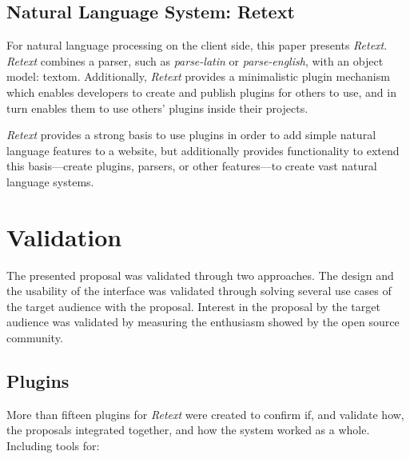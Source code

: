 \section{Natural Language System:
  Retext}\label{natural-language-system-retext}

For natural language processing on the client side, this paper presents
  \emph{Retext}.
\emph{Retext} combines a parser, such as \emph{parse-latin} or
  \emph{parse-english}, with an object model: \gls{textom}.
Additionally, \emph{Retext} provides a minimalistic plugin mechanism which
  enables developers to create and publish plugins for others to use, and in
  turn enables them to use others' plugins inside their projects.

\emph{Retext} provides a strong basis to use plugins in order to add simple
  natural language features to a website, but additionally provides
  functionality to extend this basis---create plugins, parsers, or other
  features---to create vast natural language systems.

\chapter{Validation}\label{validation}

The presented proposal was validated through two approaches.
The design and the usability of the interface was validated through
  solving several use cases of the target audience with the proposal.
Interest in the proposal by the target audience was validated by
  measuring the enthusiasm showed by the open source community.

\section{Plugins}\label{plugins}

More than fifteen plugins for \emph{Retext} were created to confirm if,
  and validate how, the proposals integrated together, and how the system
  worked as a whole. Including tools for:

